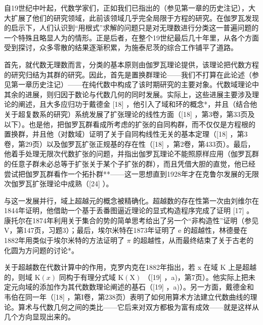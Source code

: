自19世纪中叶起，代数学家们，正如我们已指出的（参见第一章的历史注记），大大扩展了他们的研究领域，此前该领域几乎完全局限于方程的研究。在伽罗瓦发现的启示下，人们认识到“用根式”求解的问题只是对无理数进行分类这一普遍问题的一个特殊且略显人为的情形。正是后者，在整个19世纪最后几十年里，从各个方面受到探讨，众多零散的结果逐渐积累，为施泰尼茨的综合工作铺平了道路。

首先，就代数无理数而言，分类的基本原则由伽罗瓦理论提供，该理论把代数方程的研究归结为其群的研究。因此，首先是置换群理论——我们不打算在此论述（参见第一章历史注记）——在纯代数中构成了该时期研究的主要对象。代数域理论中其余的进展，则归因于数论与代数几何的同时发展。实际上，这些进展主要涉及理论的阐述，且大多应归功于戴德金 {[}18{]} ，他引入了域和环的概念*，并且（结合他关于超复数系的研究）系统发展了扩张理论的线性方面（{[}18{]} ，第3卷，第33页及以下）。也是他，把伽罗瓦群看成所考虑的扩张的自同构群，而不仅仅是方程根的置换群，并且他（对数域）证明了关于自同构线性无关的基本定理（{[}18{]} ，第3卷，第29页）以及伽罗瓦扩张正规基的存在性（{[}18{]} ，第2卷，第433页）。最后，他着手处理无限次代数扩张的问题，并指出伽罗瓦理论不能照原样应用（伽罗瓦群的任意子群未必总等于扩张关于某个子扩张的群），而且凭借大胆的直觉，他已经尝试把伽罗瓦群看作一个拓扑群**——这一思想直到1928年才在克鲁尔发展的无限次伽罗瓦扩张理论中成熟（{[}24{]} ）。

与这一发展并行，域上超越元的概念被精确化。超越数的存在性第一次由刘维尔在1844年证明，他借助一个基于丢番图逼近理论的显式构造程序完成了证明 {[}17{]} 。康托尔在1874年利用关于集合的势的简单思考给出了另一个“非构造性”证明（参见V，第147页，习题3）；最后，埃尔米特在1873年证明了 e 的超越性，林德曼在1882年用类似于埃尔米特的方法证明了 \(\pi\) 的超越性，从而最终结束了关于古老的化圆为方问题的讨论*。

关于超越数在代数计算中的作用，克罗内克在1882年指出，若 x 在域 K 上是超越的，则域 \(\mathrm{K}(x)\) 同构于有理分式域 \(\mathrm{K}(\mathrm{X})\) （{[}19{]} ，a)，第7页）。他实际上把未定元向域的添加作为其代数数理论阐述的基石（{[}19{]} ，a)）。另一方面，戴德金和韦伯在同一年（{[}18{]} ，第I卷，第238页）表明了如何用算术方法建立代数曲线的理论。算术与代数几何之间的类比——它后来对双方都极为富有成效——就是这样从几个方向显现出来的。

